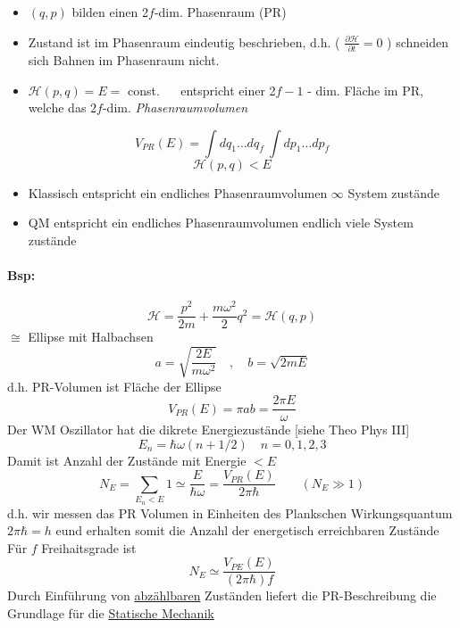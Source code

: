 \documentclass[titlepage,12pt,a4paper,ngerman]{report}
\begin{document}
{\begin{minipage}{.65\textwidth}
	\begin{itemize}
		\item $(q,p)$ bilden einen 2$f$-dim. Phasenraum (PR)
		\item Zustand ist im Phasenraum eindeutig beschrieben, d.h. ( $\frac{\partial \mathcal H}{\partial t}= 0$ ) schneiden sich Bahnen im Phasenraum nicht.
		\item $\mathcal H(p,q) = E =$ const. $\quad$ entspricht einer 2$f - 1$ - dim. Fläche im PR, welche das $2f$-dim. \textit{Phasenraumvolumen}
	\end{itemize}
\end{minipage}%
\begin{minipage}{.35\textwidth}%
\end{minipage}  
$$V_{PR} (E) = \int dq_1 \dots dq_f\ \int dp_1 \dots dp_f$$
$$\mathcal H (p,q) < E$$
\begin{itemize}
	\item Klassisch entspricht ein endliches Phasenraumvolumen $\infty$ System zustände
	\item QM entspricht ein endliches Phasenraumvolumen endlich viele System zustände
\end{itemize}

\paragraph{Bsp:}
$$\mathcal H = \frac{p^2}{2m} + \frac{m\omega^2}{2} q^2 = \mathcal H(q,p)$$
$\cong$ Ellipse mit Halbachsen
$$a = \sqrt{\frac{2E}{m \omega^2}} \quad , \quad b = \sqrt{2mE}$$
d.h. PR-Volumen ist Fläche der Ellipse 
$$V_{PR} (E) = \pi a b = \frac{2 \pi E}{\omega}$$
Der WM Oszillator hat die dikrete Energiezustände [siehe Theo Phys III]
$$E_n = \hbar \omega ( n+ 1/2 ) \quad n = 0,1,2,3$$
Damit ist Anzahl der Zustände mit Energie $< E$
$$N_E = \sum_{E_n < E} 1 \simeq \frac{E}{\hbar \omega} = \frac{V_{PR} (E)}{2 \pi \hbar} \qquad ( N_E \gg 1)$$
d.h. wir messen das PR Volumen in Einheiten des Plankschen Wirkungsquantum $2 \pi \hbar = h$ eund erhalten somit die Anzahl der energetisch erreichbaren Zustände\\
Für $f$ Freihaitsgrade ist $$N_E \simeq \frac{V_{PE}(E)}{(2\pi \hbar) f}$$
Durch Einführung von \underline{abzählbaren} Zuständen liefert die PR-Beschreibung die Grundlage für die \underline{Statische Mechanik}

}
\end{document}

